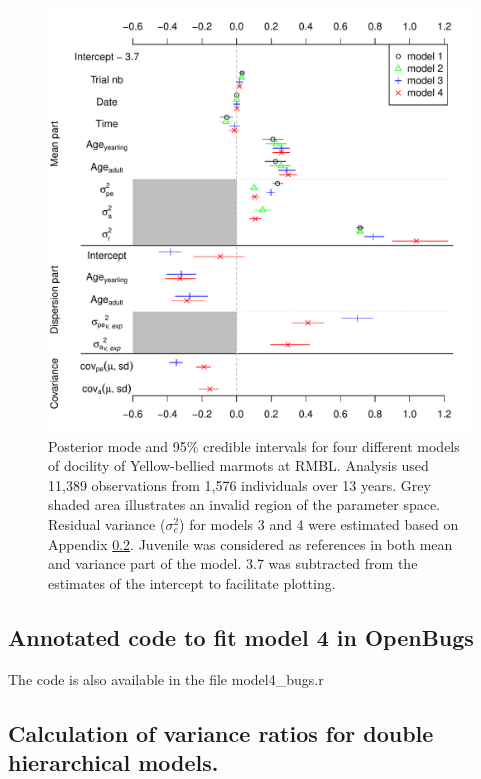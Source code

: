 \documentclass[a4paper,12pt,twoside]{article}
\begin{document}
	\newpage
	\begin{figure}[H]
		\caption{Posterior mode and 95\% credible intervals for four different models of docility of Yellow-bellied marmots at RMBL. 
			Analysis used 11,389 observations from 1,576 individuals over 13 years. 
			Grey shaded area illustrates an invalid region of the parameter space. 
			Residual variance ($\sigma_e^2$) for models 3 and 4 were estimated based on Appendix \ref{ESM:equations}. 
			Juvenile was considered as references in both mean and variance part of the model.
			3.7 was subtracted from the estimates of the intercept to facilitate plotting.
		}
		\label{Fig:noyr}
		\begin{center}
			\includegraphics[width=14cm]{Fig1noyear.pdf}
		\end{center}
	\end{figure}
	
	
	\newpage
	\subsection{Annotated code to fit model 4 in OpenBugs}\label{ESM:bugscode}
	The code is also available in the file model4\_bugs.r
	
	
	\newpage
	\subsection{Calculation of variance ratios for double hierarchical models.}\label{ESM:equations}
	
\end{document}
